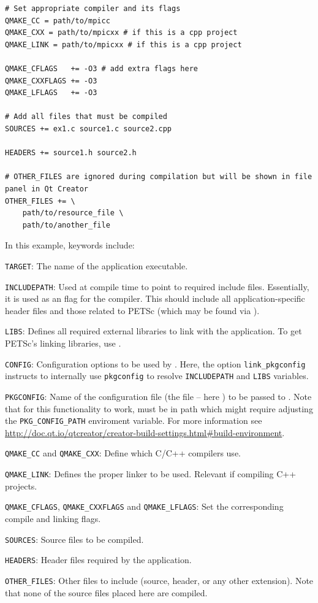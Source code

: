 {{{\begin{lstlisting}
# Set appropriate compiler and its flags
QMAKE_CC = path/to/mpicc
QMAKE_CXX = path/to/mpicxx # if this is a cpp project
QMAKE_LINK = path/to/mpicxx # if this is a cpp project

QMAKE_CFLAGS   += -O3 # add extra flags here
QMAKE_CXXFLAGS += -O3
QMAKE_LFLAGS   += -O3

# Add all files that must be compiled
SOURCES += ex1.c source1.c source2.cpp

HEADERS += source1.h source2.h

# OTHER_FILES are ignored during compilation but will be shown in file panel in Qt Creator
OTHER_FILES += \
	path/to/resource_file \
	path/to/another_file
\end{lstlisting}

In this example, keywords include:
\begin{tightitemize}
\item \lstinline{TARGET}: The name of the application executable.
\item \lstinline{INCLUDEPATH}: Used at compile time to point to required include files. Essentially, it is used as an  flag for the compiler. This should include all application-specific header files and those related to PETSc (which may be found via ).
\item \lstinline{LIBS}: Defines all required external libraries to link with the application. To get PETSc's linking libraries, use .
\item \lstinline{CONFIG}: Configuration options to be used by \trl{qmake}. Here, the option \lstinline{link_pkgconfig} instructs \trl{qmake} to internally 
  use \lstinline{pkgconfig} to resolve \lstinline{INCLUDEPATH} and \lstinline{LIBS} variables.
\item \lstinline{PKGCONFIG}: Name of the configuration file (the \trl{.pc} file -- here ) to be passed to \trl{pkgconfig}. Note that for this functionality to work, \trl{PETSc.pc} must be in path which might require adjusting the \lstinline{PKG_CONFIG_PATH} enviroment variable. 
  For more information see \url{http://doc.qt.io/qtcreator/creator-build-settings.html#build-environment}.
\item \lstinline{QMAKE_CC} and \lstinline{QMAKE_CXX}: Define which C/C++ compilers use.
\item \lstinline{QMAKE_LINK}: Defines the proper linker to be used. Relevant if compiling C++ projects.
\item \lstinline{QMAKE_CFLAGS}, \lstinline{QMAKE_CXXFLAGS} and \lstinline{QMAKE_LFLAGS}: Set the corresponding compile and linking flags.
\item \lstinline{SOURCES}: Source files to be compiled.
\item \lstinline{HEADERS}: Header files required by the application. 
\item \lstinline{OTHER_FILES}: Other files to include (source, header, or any other extension). Note that none of the source files placed here are compiled.
\end{tightitemize}

}}}
